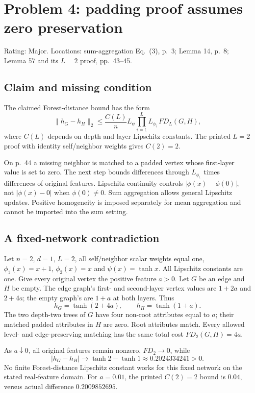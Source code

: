 \documentclass[10pt]{article}
\begin{document}
\section*{Problem 4: padding proof assumes zero preservation}
Rating: Major. Locations: sum-aggregation Eq. (3), p. 3; Lemma 14, p. 8; Lemma 57 and its \(L=2\) proof, pp. 43–45.\par
\subsection*{Claim and missing condition}
The claimed Forest-distance bound has the form \[\|h_G-h_H\|_2\le\frac{C(L)}n L_\psi
 \prod_{i=1}^L L_{\phi_i}\,FD_L(G,H), \tag{R3}\] where \(C(L)\) depends on depth and layer Lipschitz constants. The printed \(L=2\) proof with identity self/neighbor weights gives \(C(2)=2\).\par
On p. 44 a missing neighbor is matched to a padded vertex whose first-layer value is set to zero. The next step bounds differences through \(L_{\phi_1}\) times differences of original features. Lipschitz continuity controls \(|\phi(x)-\phi(0)|\), not \(|\phi(x)-0|\) when \(\phi(0)\ne0\). Sum aggregation allows general Lipschitz updates. Positive homogeneity is imposed separately for mean aggregation and cannot be imported into the sum setting.\par
\subsection*{A fixed-network contradiction}
Let \(n=2\), \(d=1\), \(L=2\), all self/neighbor scalar weights equal one, \(\phi_1(x)=x+1\), \(\phi_2(x)=x\) and \(\psi(x)=\tanh x\). All Lipschitz constants are one. Give every original vertex the positive feature \(a>0\). Let \(G\) be an edge and \(H\) be empty. The edge graph’s first- and second-layer vertex values are \(1+2a\) and \(2+4a\); the empty graph’s are \(1+a\) at both layers. Thus \[h_G=\tanh(2+4a),\qquad h_H=\tanh(1+a).\] The two depth-two trees of \(G\) have four non-root attributes equal to \(a\); their matched padded attributes in \(H\) are zero. Root attributes match. Every allowed level- and edge-preserving matching has the same total cost \(FD_2(G,H)=4a\).\par
As \(a\downarrow0\), all original features remain nonzero, \(FD_2\to0\), while \[|h_G-h_H|\longrightarrow\tanh2-\tanh1
 \approx0.2024334241>0.\] No finite Forest-distance Lipschitz constant works for this fixed network on the stated real-feature domain. For \(a=0.01\), the printed \(C(2)=2\) bound is \(0.04\), versus actual difference \(0.2009852695\).\par
\end{document}
